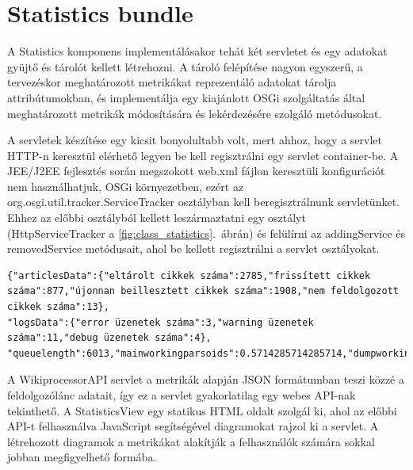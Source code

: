 
\section{Statistics bundle}
\label{sec:statisticsbundle}

A Statistics komponens implementálásakor tehát két servletet és egy adatokat gyüjtő és tárolót kellett létrehozni. A tároló felépítése nagyon egyszerű, a tervezéskor meghatározott metrikákat reprezentáló adatokat tárolja attribútumokban, és implementálja egy kiajánlott OSGi szolgáltatás által meghatározott metrikák módosítására és lekérdezésére szolgáló metódusokat.

A servletek készítése egy kicsit bonyolultabb volt, mert ahhoz, hogy a servlet HTTP-n keresztül elérhető legyen be kell regisztrálni egy servlet container-be. A JEE/J2EE fejlesztés során megszokott web.xml fájlon keresztüli konfigurációt nem használhatjuk, OSGi környezetben, ezért az org.osgi.util.tracker.ServiceTracker osztályban kell beregisztrálnunk servletünket. Ehhez az előbbi osztályból kellett leszármaztatni egy osztályt (HttpServiceTracker a \ref{fig:class_statistics}.~ábrán) és felülírni az addingService és removedService metódusait, ahol be kellett regisztrálni a servlet osztályokat.

\begin{lstlisting}[label={lst:apidata}, caption=A WikiprocessorAPI által szolgáltatott adatok,breaklines=true]
{"articlesData":{"eltárolt cikkek száma":2785,"frissített cikkek száma":877,"újonnan beillesztett cikkek száma":1908,"nem feldolgozott cikkek száma":13},
"logsData":{"error üzenetek száma":3,"warning üzenetek száma":11,"debug üzenetek száma":4},
"queuelength":6013,"mainworkingparsoids":0.5714285714285714,"dumpworkingparsoids":0.8,"dumpprocess":0.11469880217730487}
\end{lstlisting}

A WikiprocessorAPI servlet a metrikák alapján JSON formátumban teszi közzé a feldolgozólánc adatait, így ez a servlet gyakorlatilag egy webes API-nak tekinthető. A StatisticsView egy statikus HTML oldalt szolgál ki, ahol az előbbi API-t felhasználva JavaScript segítségével diagramokat rajzol ki a servlet. A létrehozott diagramok a metrikákat alakítják a felhasználók számára sokkal jobban megfigyelhető formába.



